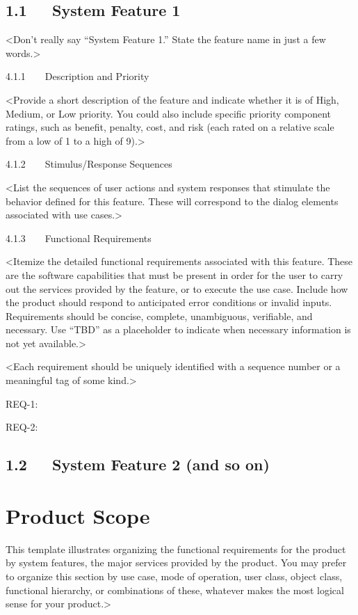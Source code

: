 \documentclass{scrreprt}
\begin{document}
\subsection*{1.1   System Feature 1}

<Don’t really say “System Feature 1.” State the feature name in just a few words.>

4.1.1    Description and Priority

<Provide a short description of the feature and indicate whether it is of High, Medium, or Low priority. You could also include specific priority component ratings, such as benefit, penalty, cost, and risk (each rated on a relative scale from a low of 1 to a high of 9).>

4.1.2    Stimulus/Response Sequences

<List the sequences of user actions and system responses that stimulate the behavior defined for this feature. These will correspond to the dialog elements associated with use cases.>

4.1.3    Functional Requirements

<Itemize the detailed functional requirements associated with this feature. These are the software capabilities that must be present in order for the user to carry out the services provided by the feature, or to execute the use case. Include how the product should respond to anticipated error conditions or invalid inputs. Requirements should be concise, complete, unambiguous, verifiable, and necessary. Use “TBD” as a placeholder to indicate when necessary information is not yet available.>

<Each requirement should be uniquely identified with a sequence number or a meaningful tag of some kind.>

REQ-1:

REQ-2:

\subsection*{1.2   System Feature 2 (and so on)}
    \section{Product Scope}
    This template illustrates organizing the functional requirements for the product by system features, the major services provided by the product. You may prefer to organize this section by use case, mode of operation, user class, object class, functional hierarchy, or combinations of these, whatever makes the most logical sense for your product.>
\end{document}
